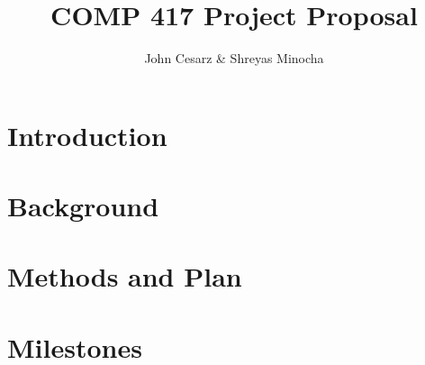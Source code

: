 \documentclass{article}
\title{COMP 417 Project Proposal}
\author{John Cesarz \& Shreyas Minocha}
\begin{document}
\maketitle

\section{Introduction}


\lipsum[1]

\section{Background}


\lipsum[2]

\section{Methods and Plan}



\lipsum[3]

\section{Milestones}


\lipsum[4]
\end{document}
